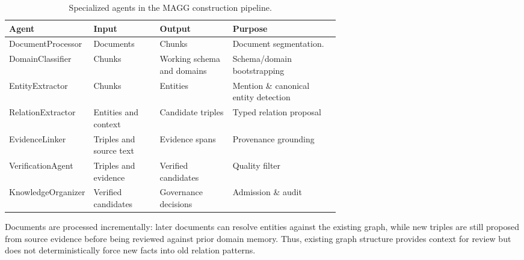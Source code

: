 \documentclass{article}
\begin{document}
\begin{table}[h]
\centering
\caption{Specialized agents in the MAGG construction pipeline.}
\label{tab:agent_pipeline}
\footnotesize
\begin{tabularx}{\linewidth}{@{}p{0.22\linewidth}p{0.20\linewidth}p{0.22\linewidth}X@{}}
\toprule
\textbf{Agent} & \textbf{Input} & \textbf{Output} & \textbf{Purpose} \\
\midrule
DocumentProcessor & Documents & Chunks & Document segmentation. \\
DomainClassifier & Chunks & Working schema and domains & Schema/domain bootstrapping \\
EntityExtractor & Chunks & Entities & Mention \& canonical entity detection \\
RelationExtractor & Entities and context & Candidate triples & Typed relation proposal \\
EvidenceLinker & Triples and source text & Evidence spans & Provenance grounding \\
VerificationAgent & Triples and evidence & Verified candidates & Quality filter \\
KnowledgeOrganizer & Verified candidates & Governance decisions & Admission \& audit \\
\bottomrule
\end{tabularx}
\end{table}


Documents are processed incrementally: later documents can resolve entities against the existing graph, while new triples are still proposed from source evidence before being reviewed against prior domain memory. Thus, existing graph structure provides context for review but does not deterministically force new facts into old relation patterns.
\end{document}
